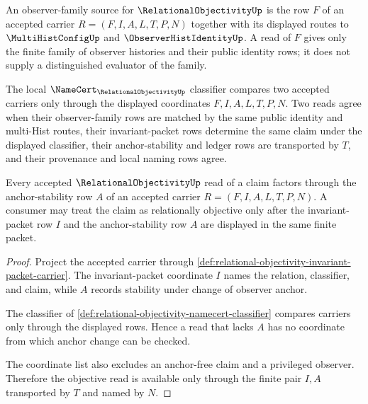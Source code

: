 \begin{definition}
\label{def:relational-objectivity-observer-family-source}
An observer-family source for $\RelationalObjectivityUp$ is the row $F$ of an accepted carrier $R=(F,I,A,L,T,P,N)$ together with its displayed routes to $\MultiHistConfigUp$ and $\ObserverHistIdentityUp$. A read of $F$ gives only the finite family of observer histories and their public identity rows; it does not supply a distinguished evaluator of the family.
\end{definition}

\begin{definition}
\label{def:relational-objectivity-namecert-classifier}
The local $\NameCert_{\RelationalObjectivityUp}$ classifier compares two accepted carriers only through the displayed coordinates $F,I,A,L,T,P,N$. Two reads agree when their observer-family rows are matched by the same public identity and multi-Hist routes, their invariant-packet rows determine the same claim under the displayed classifier, their anchor-stability and ledger rows are transported by $T$, and their provenance and local naming rows agree.
\end{definition}

\begin{theorem}
\label{thm:relational-objectivity-anchor-stability-obligation}
Every accepted $\RelationalObjectivityUp$ read of a claim factors through the anchor-stability row $A$ of an accepted carrier $R=(F,I,A,L,T,P,N)$. A consumer may treat the claim as relationally objective only after the invariant-packet row $I$ and the anchor-stability row $A$ are displayed in the same finite packet.
\end{theorem}
\begin{proof}
Project the accepted carrier through \autoref{def:relational-objectivity-invariant-packet-carrier}. The invariant-packet coordinate $I$ names the relation, classifier, and claim, while $A$ records stability under change of observer anchor.

The classifier of \autoref{def:relational-objectivity-namecert-classifier} compares carriers only through the displayed rows. Hence a read that lacks $A$ has no coordinate from which anchor change can be checked.

The coordinate list also excludes an anchor-free claim and a privileged observer. Therefore the objective read is available only through the finite pair $I,A$ transported by $T$ and named by $N$.
\end{proof}

